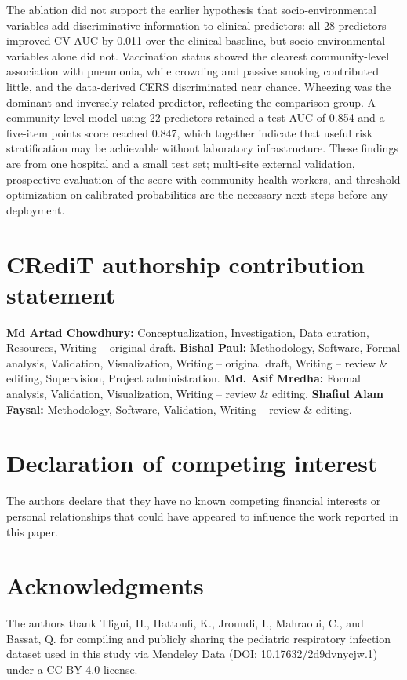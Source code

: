 \documentclass[a4paper,fleqn]{cas-dc}
\begin{document}
The ablation did not support the earlier hypothesis that socio-environmental variables add discriminative information to clinical predictors: all 28 predictors improved CV-AUC by 0.011 over the clinical baseline, but socio-environmental variables alone did not. Vaccination status showed the clearest community-level association with pneumonia, while crowding and passive smoking contributed little, and the data-derived CERS discriminated near chance. Wheezing was the dominant and inversely related predictor, reflecting the comparison group. A community-level model using 22 predictors retained a test AUC of 0.854 and a five-item points score reached 0.847, which together indicate that useful risk stratification may be achievable without laboratory infrastructure. These findings are from one hospital and a small test set; multi-site external validation, prospective evaluation of the score with community health workers, and threshold optimization on calibrated probabilities are the necessary next steps before any deployment.

\section*{CRediT authorship contribution statement}

\textbf{Md Artad Chowdhury:} Conceptualization, Investigation, Data curation, Resources, Writing -- original draft. \textbf{Bishal Paul:} Methodology, Software, Formal analysis, Validation, Visualization, Writing -- original draft, Writing -- review \& editing, Supervision, Project administration. \textbf{Md. Asif Mredha:} Formal analysis, Validation, Visualization, Writing -- review \& editing. \textbf{Shafiul Alam Faysal:} Methodology, Software, Validation, Writing -- review \& editing.

\section*{Declaration of competing interest}

The authors declare that they have no known competing financial interests or personal relationships that could have appeared to influence the work reported in this paper.

\section*{Acknowledgments}

The authors thank Tligui, H., Hattoufi, K., Jroundi, I., Mahraoui, C., and Bassat, Q. for compiling and publicly sharing the pediatric respiratory infection dataset used in this study via Mendeley Data (DOI: 10.17632/2d9dvnycjw.1) under a CC BY 4.0 license.
\end{document}
